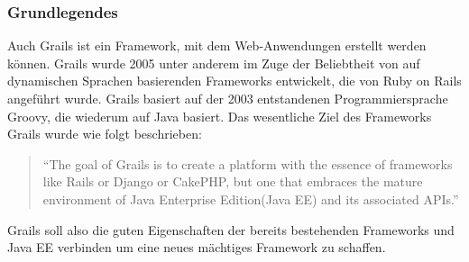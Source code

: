 \subsubsection{Grundlegendes}
Auch Grails ist ein Framework, mit dem Web-Anwendungen erstellt werden können. Grails wurde 2005 unter anderem im Zuge der Beliebtheit von auf dynamischen Sprachen basierenden Frameworks entwickelt, die von Ruby on Rails angeführt wurde. Grails basiert auf der 2003 entstandenen Programmiersprache Groovy, die wiederum auf Java basiert\autocite[S.XXV]{DGG2002}\autocite[S.3]{GGR2009}. Das wesentliche Ziel des Frameworks Grails wurde wie folgt beschrieben: \begin{quote}\small "`The goal of Grails is to create a platform with the essence of frameworks like Rails or Django or CakePHP, but one that embraces the mature environment of Java Enterprise Edition(Java EE) and its associated APIs."'\autocite[S.4]{DGG2002}\end{quote} Grails soll also die guten Eigenschaften der bereits bestehenden Frameworks und Java EE verbinden um eine neues mächtiges Framework zu schaffen.

